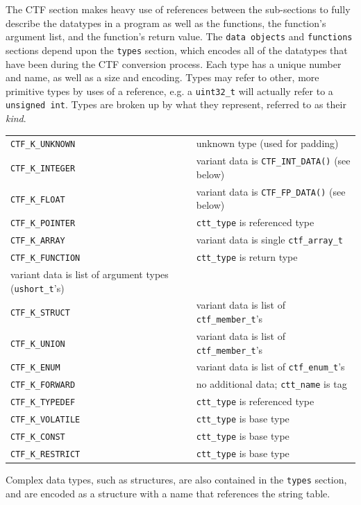 The CTF section makes heavy use of references between the sub-sections
to fully describe the datatypes in a program as well as the functions,
the function's argument list, and the function's return value.  The
\verb|data objects| and \verb|functions| sections depend upon the
\verb|types| section, which encodes all of the datatypes that have
been during the CTF conversion process.  Each type has a unique number
and name, as well as a size and encoding.  Types may refer to other,
more primitive types by uses of a reference, e.g. a \verb|uint32_t|
will actually refer to a \verb|unsigned int|.  Types are broken up by
what they represent, referred to as their \emph{kind}.


\begin{tabular}{|l|l}
\hline
\verb|CTF_K_UNKNOWN| & unknown type (used for padding)\\
\verb|CTF_K_INTEGER| & variant data is \verb|CTF_INT_DATA()| (see below)\\
\verb|CTF_K_FLOAT| & variant data is \verb|CTF_FP_DATA()| (see below)\\
\verb|CTF_K_POINTER| & \verb|ctt_type| is referenced type\\
\verb|CTF_K_ARRAY| & variant data is single \verb|ctf_array_t|\\
  \verb|CTF_K_FUNCTION| & \verb|ctt_type| is return type\\
  variant data is list of argument types (\verb|ushort_t|'s)\\
\verb|CTF_K_STRUCT| & variant data is list of \verb|ctf_member_t|'s\\
\verb|CTF_K_UNION| & variant data is list of \verb|ctf_member_t|'s\\
\verb|CTF_K_ENUM| & variant data is list of \verb|ctf_enum_t|'s\\
\verb|CTF_K_FORWARD| & no additional data; \verb|ctt_name| is tag\\
\verb|CTF_K_TYPEDEF| & \verb|ctt_type| is referenced type\\
\verb|CTF_K_VOLATILE| & \verb|ctt_type| is base type\\
\verb|CTF_K_CONST| & \verb|ctt_type| is base type\\
\verb|CTF_K_RESTRICT| & \verb|ctt_type| is base type\\
\hline
\end{tabular}

Complex data types, such as structures, are also contained in the
\verb|types| section, and are encoded as a structure with a name that
references the string table.

